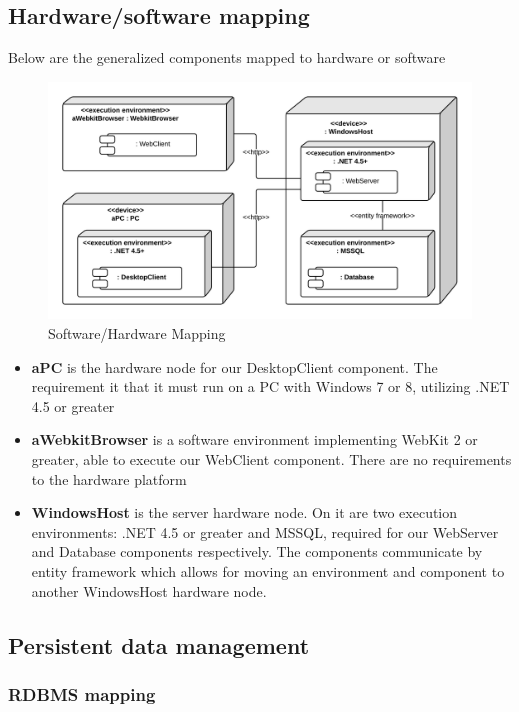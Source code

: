 \subsection{Hardware/software mapping}
\label{sec:Hardware/software mapping}
Below are the generalized components mapped to hardware or software
\begin{figure}[H]
\includegraphics[scale=0.2]{img/SDD/SoftwareHardwareMapping.png}
\caption{Software/Hardware Mapping}
\label{fig:SoftwareHardwareMapping}
\end{figure}

\begin{itemize}
\item \textbf{aPC} is the hardware node for our DesktopClient component. The requirement it that it must run on a PC with Windows 7 or 8, utilizing .NET 4.5 or greater
\item \textbf{aWebkitBrowser} is a software environment implementing WebKit 2 or greater, able to execute our WebClient component. There are no requirements to the hardware platform
\item \textbf{WindowsHost} is the server hardware node. On it are two execution environments: .NET 4.5 or greater and MSSQL, required for our WebServer and Database components respectively. The components communicate by entity framework which allows for moving an environment and component to another WindowsHost hardware node.
\end{itemize}

\subsection{Persistent data management}

\subsubsection{RDBMS mapping}

